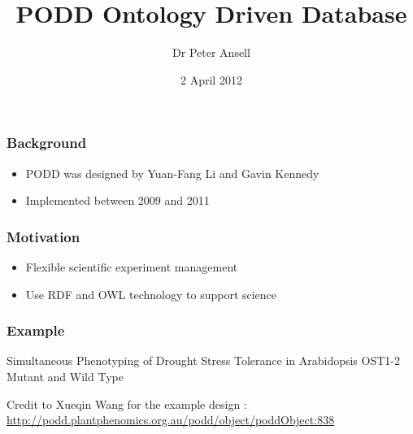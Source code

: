 \documentclass[12pt]{beamer}
\title{PODD Ontology Driven Database}
\author{Dr Peter Ansell}
\institute{University of Queensland}
\date{2 April 2012}
\begin{document}
\begin{frame}
\titlepage
\end{frame}


\begin{frame}
\frametitle{Background} 

\begin{itemize}
 \item PODD was designed by Yuan-Fang Li and Gavin Kennedy
 \item Implemented between 2009 and 2011
\end{itemize}

\end{frame}

\begin{frame}
\frametitle{Motivation} 

\begin{itemize}
 \item Flexible scientific experiment management
 \item Use RDF and OWL technology to support science
\end{itemize}


\end{frame}

\begin{frame}
\frametitle{Example} 

Simultaneous Phenotyping of Drought Stress Tolerance in Arabidopsis OST1-2 Mutant and Wild Type 

\vskip 12pt


Credit to Xueqin Wang for the example design : \url{http://podd.plantphenomics.org.au/podd/object/poddObject:838}

\end{frame}

\bgroup
{}
\begin{frame}[plain]{}
\end{frame}
\egroup
\end{document}
